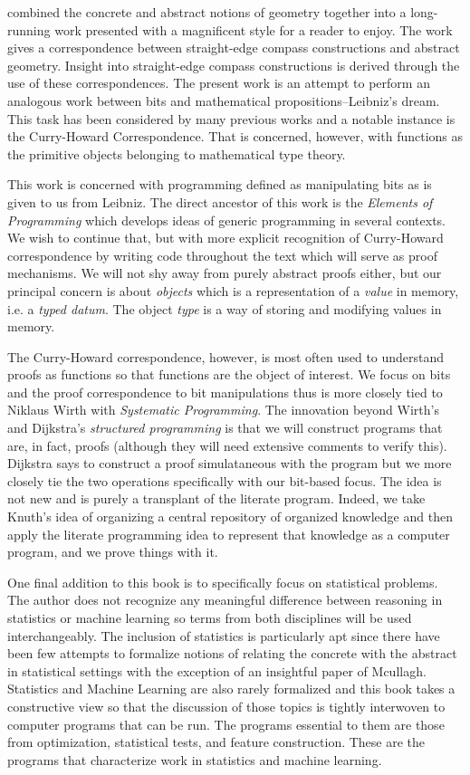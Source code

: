   combined the concrete and abstract notions of
geometry together into a long-running work presented with a
magnificent style for a reader to enjoy.  The work gives a
correspondence between straight-edge compass constructions and
abstract geometry.  Insight into straight-edge compass constructions
is derived through the use of these correspondences.  The present work
is an attempt to perform an analogous work between bits and
mathematical propositions--Leibniz's dream.  This task has been
considered by many previous works and a notable instance is the
Curry-Howard Correspondence.  That is concerned, however, with
functions as the primitive objects belonging to mathematical type
theory.

This work is concerned with programming defined as manipulating bits
as is given to us from Leibniz.  The direct ancestor of this work is
the {\it Elements of Programming} \cite{stepanov2009elements} which
develops ideas of generic programming in several contexts.  We wish to
continue that, but with more explicit recognition of Curry-Howard
correspondence by writing code throughout the text which will serve as
proof mechanisms.  We will not shy away from purely abstract proofs
either, but our principal concern is about {\it objects} which is a
representation of a {\it value} in memory, i.e. a {\it typed datum}.
The object {\it type} is a way of storing and modifying values in
memory.

The Curry-Howard correspondence, however, is most often used to
understand proofs as functions so that functions are the object of
interest.  We focus on bits and the proof correspondence to bit
manipulations thus is more closely tied to Niklaus Wirth with {\it
  Systematic Programming}.  The innovation beyond Wirth's and
Dijkstra's {\it structured programming } is that we will construct
programs that are, in fact, proofs (although they will need extensive
comments to verify this).  Dijkstra says to construct a proof
simulataneous with the program but we more closely tie the two
operations specifically with our bit-based focus.  The idea is not new
and is purely a transplant of the literate program.  Indeed, we take
Knuth's idea of organizing a central repository of organized knowledge
and then apply the literate programming idea to represent that
knowledge as a computer program, and we prove things with it.

One final addition to this book is to specifically focus on
statistical problems.  The author does not recognize any meaningful
difference between reasoning in statistics or machine learning so
terms from both disciplines will be used interchangeably.  The
inclusion of statistics is particularly apt since there have been few
attempts to formalize notions of relating the concrete with the
abstract in statistical settings with the exception of an insightful
paper of Mcullagh. Statistics and Machine Learning are also rarely
formalized and this book takes a constructive view so that the discussion
of those topics is tightly interwoven to computer programs that can be run. The
programs essential to them are those from optimization, statistical tests,
 and feature construction.  These are the programs that characterize work in 
statistics and machine learning.

